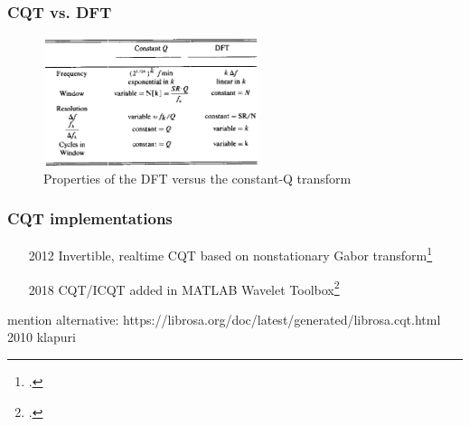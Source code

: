 \documentclass{beamer}
\begin{document}
\begin{frame}
	\frametitle{CQT vs. DFT}
	\begin{figure}
		\centering
		\includegraphics[height=3.75cm]{./dftvcqt.png}
		\caption{Properties of the DFT versus the constant-Q transform}
	\end{figure}
\end{frame}

\begin{frame}
	\frametitle{CQT implementations}
	\begin{itemize}
		\item[2012] Invertible, realtime CQT based on nonstationary Gabor transform\footcite{rtcqt}
		\item[2018] CQT/ICQT added in MATLAB Wavelet Toolbox\footcite{matlabcqt}
	\end{itemize}
	mention alternative: https://librosa.org/doc/latest/generated/librosa.cqt.html
	2010 klapuri
\end{frame}
\end{document}
